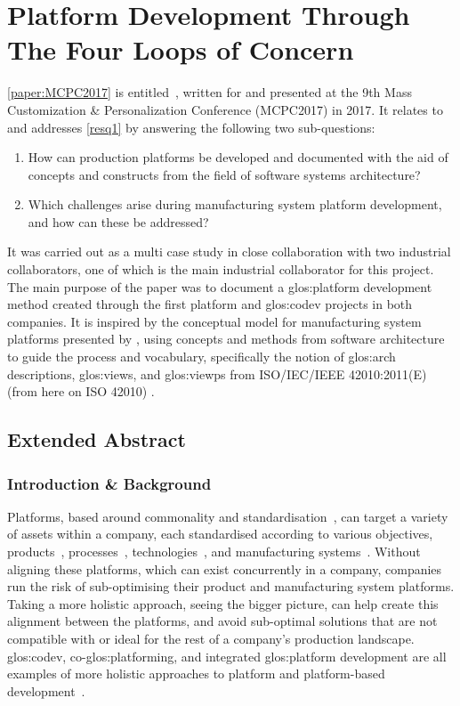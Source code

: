 \section{Platform Development Through The Four Loops of Concern}\label{sec:FLC}
\cref{paper:MCPC2017} is entitled~, written for and presented at the 9th Mass Customization \& Personalization Conference (MCPC2017) in 2017.
It relates to and addresses \cref{resq1} by answering the following two sub-questions:
\begin{enumerate}[leftmargin=3em, label=RQ1.\arabic*]
    \item How can production platforms be developed and documented with the aid of concepts and constructs from the field of software systems architecture?
    \item Which challenges arise during manufacturing system platform development, and how can these be addressed?
\end{enumerate}
It was carried out as a multi case study in close collaboration with two industrial collaborators, one of which is the main industrial collaborator for this project.
The main purpose of the paper was to document a \gls{glos:platform} development method created through the first platform and \gls{glos:codev} projects in both companies.
It is inspired by the conceptual model for manufacturing system platforms presented by \textcite{BossenCMod}, using concepts and methods from software architecture to guide the process and vocabulary, specifically the notion of \gls{glos:arch} descriptions, \gls{glos:view}s, and \gls{glos:viewp}s from ISO/IEC/IEEE 42010:2011(E) (from here on ISO 42010) \parencite{ISO42010}.

\subsection{Extended Abstract}
\subsubsection*{Introduction \& Background}
Platforms, based around commonality and standardisation~\parencite{BaldwinWoodard2009}, can target a variety of assets within a company, each standardised according to various objectives, \eg{} products~\parencite{AIE:276705}, processes~\parencite{JiaoJ}, technologies~\parencite{Alblas2014}, and manufacturing systems~\parencite{Michaelis2015203}.
Without aligning these platforms, which can exist concurrently in a company, companies run the risk of sub-optimising their product and manufacturing system platforms.
Taking a more holistic approach, \ie{} seeing the bigger picture, can help create this alignment between the platforms, and avoid sub-optimal solutions that are not compatible with or ideal for the rest of a company's production landscape.
\Gls{glos:codev}, co-\gls{glos:platforming}, and integrated \gls{glos:platform} development are all examples of more holistic approaches to platform and platform-based development~\parencite{MichaelisJohannesson,ElMaraghy2015407,Levandowski01092014}.

